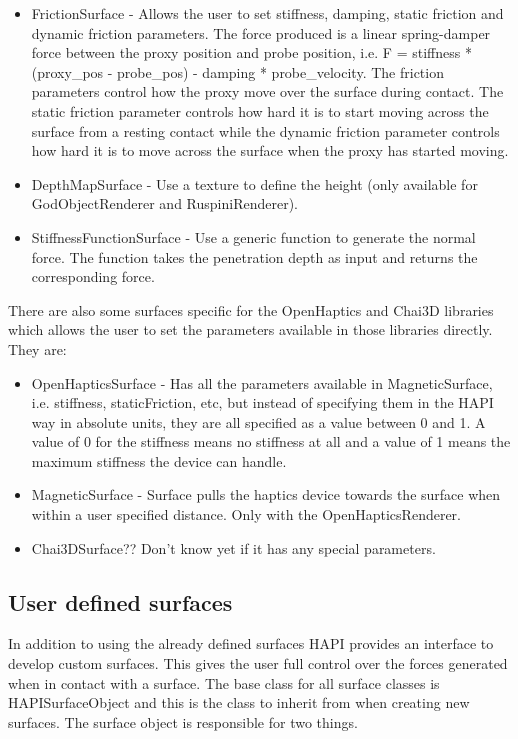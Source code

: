 \begin{itemize}
\item FrictionSurface - Allows the user to set stiffness, damping, static friction and dynamic friction parameters. The force produced is a linear spring-damper force between the proxy position and probe position, i.e. F = stiffness * (proxy_pos - probe_pos) - damping * probe_velocity. The friction parameters control how the proxy move over the surface during contact. The static friction parameter controls how hard it is to start moving across the surface from a resting contact while the dynamic friction parameter controls how hard it is to move across the surface when the proxy has started moving.
\item DepthMapSurface - Use a texture to define the height (only available for GodObjectRenderer and RuspiniRenderer).
\item StiffnessFunctionSurface - Use a generic function to generate
  the normal force. The function takes the penetration depth as input
  and returns the corresponding force. 
\end{itemize}

There are also some surfaces specific for the OpenHaptics and Chai3D
libraries which allows the user to set the parameters available in
those libraries directly. They are:
\begin{itemize}
\item OpenHapticsSurface - Has all the parameters available in
  MagneticSurface, i.e. stiffness, staticFriction, etc, but instead of
  specifying them in the HAPI way in absolute units, they are all
  specified as a value between 0 and 1. A value of 0 for the stiffness
  means no stiffness at all and a value of 1 means the maximum
  stiffness the device can handle.
\item MagneticSurface - Surface pulls the haptics device towards the
  surface when within a user specified distance. Only with the OpenHapticsRenderer.
\item Chai3DSurface?? Don't know yet if it has any special parameters.
\end{itemize}

\subsection{User defined surfaces}
In addition to using the already defined surfaces HAPI provides an interface to develop custom surfaces. This gives the user full control over the forces generated when in contact with a surface. The base class for all surface classes is HAPISurfaceObject and this is the class to inherit from when creating new surfaces. The surface object is responsible for two things. 


